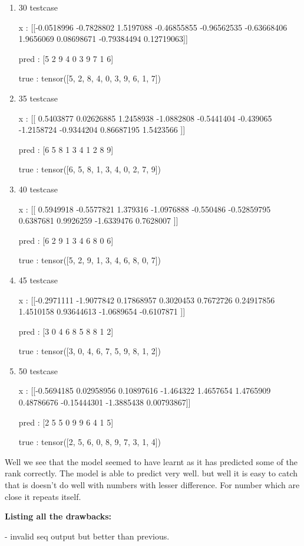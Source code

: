 \documentclass[journal,12pt,onecolumn]{IEEEtran}
\begin{document}
\begin{enumerate}
		pred :  [1 7 5 2 0 8 6 9 5 2]

		true :  tensor([1, 7, 6, 2, 0, 9, 5, 8, 4, 3])
	\item 30 testcase

		x :  [[-0.0518996  -0.7828802   1.5197088  -0.46855855 -0.96562535 -0.63668406
   1.9656069   0.08698671 -0.79384494  0.12719063]]

		pred :  [5 2 9 4 0 3 9 7 1 6]

		true :  tensor([5, 2, 8, 4, 0, 3, 9, 6, 1, 7])
	\item 35 testcase

		x :  [[ 0.5403877   0.02626885  1.2458938  -1.0882808  -0.5441404  -0.439065
  -1.2158724  -0.9344204   0.86687195  1.5423566 ]]

		pred :  [6 5 8 1 3 4 1 2 8 9]

		true :  tensor([6, 5, 8, 1, 3, 4, 0, 2, 7, 9])
	\item 40 testcase

		x :  [[ 0.5949918  -0.5577821   1.379316   -1.0976888  -0.550486   -0.52859795
   0.6387681   0.9926259  -1.6339476   0.7628007 ]]

pred :  [6 2 9 1 3 4 6 8 0 6]

true :  tensor([5, 2, 9, 1, 3, 4, 6, 8, 0, 7])
\item 45 testcase

	x :  [[-0.2971111  -1.9077842   0.17868957  0.3020453   0.7672726   0.24917856
   1.4510158   0.93644613 -1.0689654  -0.6107871 ]]

pred :  [3 0 4 6 8 5 8 8 1 2]

true :  tensor([3, 0, 4, 6, 7, 5, 9, 8, 1, 2])
\item 50 testcase

	x :  [[-0.5694185   0.02958956  0.10897616 -1.464322    1.4657654   1.4765909
   0.48786676 -0.15444301 -1.3885438   0.00793867]]

pred :  [2 5 5 0 9 9 6 4 1 5]

true :  tensor([2, 5, 6, 0, 8, 9, 7, 3, 1, 4])
\end{enumerate}

Well we see that the model seemed to have learnt as it has predicted some of the rank correctly. The model is able to predict very well. but well it is easy to catch that is doesn't do well with numbers with lesser difference. For number which are close it repeats itself. 

\textbf{Listing all the drawbacks:}

- invalid seq output but better than previous.
\end{document}
